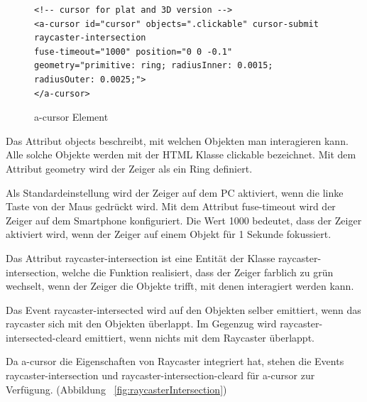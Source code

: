  \begin{figure}[ht]
\vspace*{1em}
\centering
\caption[a-cursor Element]{a-cursor Element}
\begin{lstlisting}[language=HTML5, style=htmlcssjs]
<!-- cursor for plat and 3D version -->
<a-cursor id="cursor" objects=".clickable" cursor-submit raycaster-intersection 
fuse-timeout="1000" position="0 0 -0.1" geometry="primitive: ring; radiusInner: 0.0015; radiusOuter: 0.0025;">
</a-cursor>
\end{lstlisting}
\label{fig:aCursorElement} 
\end{figure}
  
  Das Attribut {\selectfont objects} beschreibt, mit welchen Objekten man interagieren kann. Alle solche Objekte werden mit der HTML Klasse {\selectfont clickable} bezeichnet. Mit dem Attribut {\selectfont geometry} wird der Zeiger als ein Ring definiert.
  
  Als Standardeinstellung wird der Zeiger auf dem PC aktiviert, wenn die linke Taste von der Maus gedrückt wird. Mit dem Attribut {\selectfont fuse-timeout} wird der Zeiger auf dem Smartphone konfiguriert. Die Wert 1000 bedeutet, dass der Zeiger aktiviert wird, wenn der Zeiger auf einem Objekt für 1 Sekunde fokussiert.
  
  Das Attribut {\selectfont raycaster-intersection} ist eine Entität der Klasse {\selectfont raycaster-intersection}, welche die Funktion realisiert, dass der Zeiger farblich zu grün wechselt, wenn der Zeiger die Objekte trifft, mit denen interagiert werden kann.
  
  Das Event {\selectfont raycaster-intersected} wird auf den Objekten selber emittiert, wenn das raycaster sich mit den Objekten überlappt. Im Gegenzug wird {\selectfont raycaster-intersected-cleard} emittiert, wenn nichts mit dem Raycaster überlappt.
  
  Da {\selectfont a-cursor} die Eigenschaften von Raycaster integriert hat, stehen die Events {\selectfont raycaster-intersection} und {\selectfont raycaster-intersection-cleard} für {\selectfont a-cursor} zur Verfügung. (Abbildung ~\ref{fig:raycasterIntersection})
  
